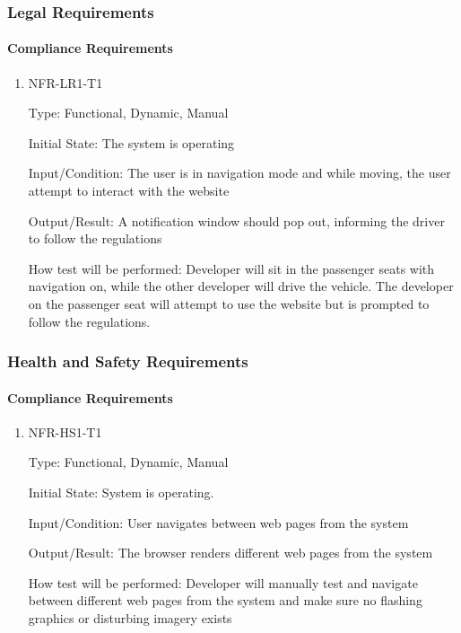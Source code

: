 \documentclass[12pt, titlepage]{article}
\begin{document}
\subsubsection{Legal Requirements}
\label{sec:5.2.7}
\paragraph{Compliance Requirements}

\begin{enumerate}

\item{NFR-LR1-T1}

Type: Functional, Dynamic, Manual
					
Initial State: The system is operating
					
Input/Condition: The user is in navigation mode and while moving, the user
attempt to interact with the website
					
Output/Result: A notification window should pop out, informing the driver to
follow the regulations
					
How test will be performed: Developer will sit in the passenger seats with
navigation on, while the other developer will drive the vehicle. The developer
on the passenger seat will attempt to use the website but is prompted to follow
the regulations.
					
\end{enumerate}

\subsubsection{Health and Safety Requirements}
\label{sec:5.2.8}
\paragraph{Compliance Requirements}

\begin{enumerate}

\item{NFR-HS1-T1}

Type: Functional, Dynamic, Manual
					
Initial State: System is operating.
					
Input/Condition: User navigates between web pages from the system
					
Output/Result: The browser renders different web pages from the system
					
How test will be performed: Developer will manually test and navigate between
different web pages from the system and make sure no flashing graphics or
disturbing imagery exists
					
\end{enumerate}
\end{document}
